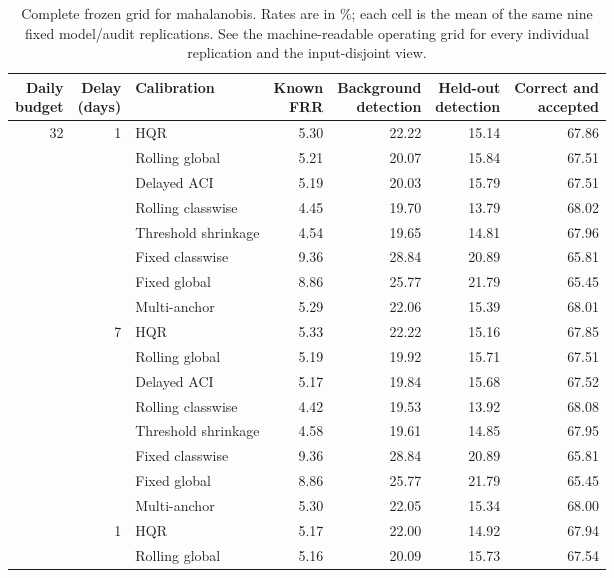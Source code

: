 \begin{table}[p]
\centering
\footnotesize
\caption{Complete frozen grid for mahalanobis. Rates are in \%; each cell is the mean of the same nine fixed model/audit replications. See the machine-readable operating grid for every individual replication and the input-disjoint view.}
\label{tab:grid-mahalanobis}
\setlength{\tabcolsep}{3pt}
\begin{tabular}{rrlrrrr}
\toprule
\shortstack{Daily\\budget} & \shortstack{Delay\\(days)} & Calibration & \shortstack{Known\\FRR} & \shortstack{Background\\detection} & \shortstack{Held-out\\detection} & \shortstack{Correct and\\accepted} \\
\midrule
32 & 1 & HQR & 5.30 & 22.22 & 15.14 & 67.86 \\
 &  & Rolling global & 5.21 & 20.07 & 15.84 & 67.51 \\
 &  & Delayed ACI & 5.19 & 20.03 & 15.79 & 67.51 \\
 &  & Rolling classwise & 4.45 & 19.70 & 13.79 & 68.02 \\
 &  & Threshold shrinkage & 4.54 & 19.65 & 14.81 & 67.96 \\
 &  & Fixed classwise & 9.36 & 28.84 & 20.89 & 65.81 \\
 &  & Fixed global & 8.86 & 25.77 & 21.79 & 65.45 \\
 &  & Multi-anchor & 5.29 & 22.06 & 15.39 & 68.01 \\
\addlinespace
32 & 7 & HQR & 5.33 & 22.22 & 15.16 & 67.85 \\
 &  & Rolling global & 5.19 & 19.92 & 15.71 & 67.51 \\
 &  & Delayed ACI & 5.17 & 19.84 & 15.68 & 67.52 \\
 &  & Rolling classwise & 4.42 & 19.53 & 13.92 & 68.08 \\
 &  & Threshold shrinkage & 4.58 & 19.61 & 14.85 & 67.95 \\
 &  & Fixed classwise & 9.36 & 28.84 & 20.89 & 65.81 \\
 &  & Fixed global & 8.86 & 25.77 & 21.79 & 65.45 \\
 &  & Multi-anchor & 5.30 & 22.05 & 15.34 & 68.00 \\
\addlinespace
128 & 1 & HQR & 5.17 & 22.00 & 14.92 & 67.94 \\
 &  & Rolling global & 5.16 & 20.09 & 15.73 & 67.54 \\

\end{tabular}
\end{table}
